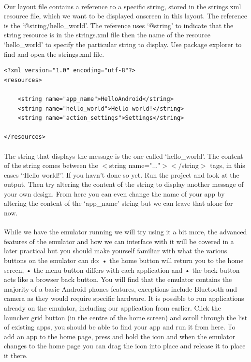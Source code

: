 \paragraph{} Our layout file contains a reference to a specific string, stored in the strings.xml resource file, which we want to be displayed onscreen in this layout. The reference is the `@string/hello\_world'. The reference uses `@string' to indicate that the string resource is in the strings.xml file then the name of the resource `hello\_world' to specify the particular string to display. Use package explorer to find and open the strings.xml file.

\begin{lstlisting}
<?xml version="1.0" encoding="utf-8"?>
<resources>

    <string name="app_name">HelloAndroid</string>
    <string name="hello_world">Hello world!</string>
    <string name="action_settings">Settings</string>

</resources>
\end{lstlisting}

\paragraph{} The string that displays the message is the one called `hello\_world'. The content of the string comes between the $<$string name="..."$>$$<$/string$>$ tags, in this cases ``Hello world!''. If you havn't done so yet. Run the project and look at the output. Then try altering the content of the string to display another message of your own design. From here you can even change the name of your app by altering the content of the `app\_name' string but we can leave that alone for now.

\paragraph{} While we have the emulator running we will try using it a bit more, the advanced features of the emulator and how we can interface with it will be covered in a later practical but you should make yourself familiar with what the various buttons on the emulator can do:
•	the home button will return you to the home screen, 
•	the menu button differs with each application and 
•	the back button acts like a browser back button. You will find that the emulator contains the majority of a basic Android phones features, exceptions include Bluetooth and camera as they would require specific hardware.
It is possible to run applications already on the emulator, including our application from earlier. Click the launcher grid button (in the centre of the home screen) and scroll through the list of existing apps, you should be able to find your app and run it from here. To add an app to the home page, press and hold the icon and when the emulator changes to the home page you can drag the icon into place and release it to place it there.

